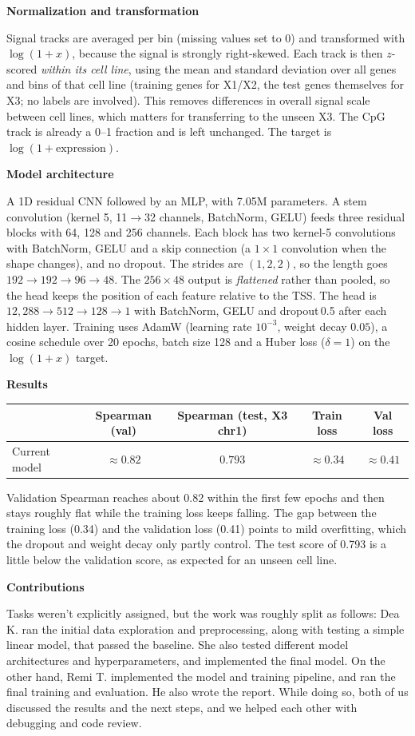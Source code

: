 \documentclass[10pt,a4paper]{article}
\newcommand{\head}[1]{\vspace{2pt}\textbf{\large #1}\par\vspace{-1pt}}
\begin{document}
\head{Normalization and transformation}
Signal tracks are averaged per bin (missing values set to 0) and transformed with $\log(1+x)$, because
the signal is strongly right-skewed. Each track is then $z$-scored \emph{within its cell line}, using the mean and
standard deviation over all genes and bins of that cell line (training genes for X1/X2, the test genes
themselves for X3; no labels are involved). This removes differences in overall signal scale between
cell lines, which matters for transferring to the unseen X3. The CpG track is already a 0--1 fraction and is left
unchanged. The target is $\log(1+\text{expression})$.

\head{Model architecture}
A 1D residual CNN followed by an MLP, with 7.05M parameters. A stem convolution (kernel 5, 11$\to$32 channels,
BatchNorm, GELU) feeds three residual blocks with 64, 128 and 256 channels. Each block has two
kernel-5 convolutions with BatchNorm, GELU and a skip connection (a $1{\times}1$ convolution when the shape changes),
and no dropout. The strides are $(1,2,2)$, so the length goes $192\to192\to96\to48$. The $256\times48$ output is
\emph{flattened} rather than pooled, so the head keeps the position of each feature relative to the TSS. The head is
$12{,}288\to512\to128\to1$ with BatchNorm, GELU and dropout\,0.5 after each hidden layer.
Training uses AdamW (learning rate $10^{-3}$, weight decay $0.05$), a cosine schedule over 20 epochs, batch size 128 and a
Huber loss ($\delta=1$) on the $\log(1+x)$ target.

\head{Results}
\begin{center}
\begin{tabular}{@{}lcccc@{}}
\toprule
 & Spearman (val) & Spearman (test, X3 chr1) & Train loss & Val loss \\
\midrule
Current model & $\approx 0.82$ & $0.793$ & $\approx 0.34$ & $\approx 0.41$ \\
\bottomrule
\end{tabular}
\end{center}
Validation Spearman reaches about 0.82 within the first few epochs and then stays roughly flat while the
training loss keeps falling. The gap between the training loss (0.34) and the validation loss (0.41) points to mild
overfitting, which the dropout and weight decay only partly control. The test score of 0.793 is a little below the
validation score, as expected for an unseen cell line.

\head{Contributions}
Tasks weren't explicitly assigned, but the work was roughly split as follows:
Dea K. ran the initial data exploration and preprocessing, along with testing a simple linear model, that passed the baseline. She also tested different model architectures and hyperparameters, and implemented the final model.
On the other hand, Remi T. implemented the model and training pipeline, and ran the final training and evaluation. He also wrote the report.
While doing so, both of us discussed the results and the next steps, and we helped each other with debugging and code review.
\end{document}
